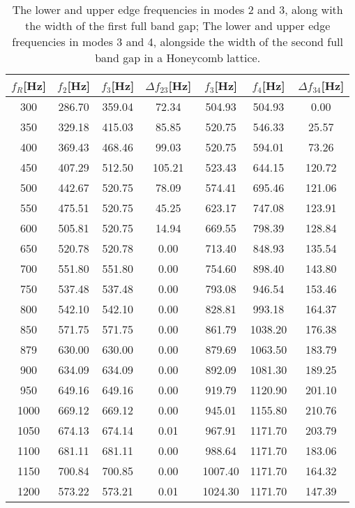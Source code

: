 \documentclass{article}
\begin{document}
\begin{table}[htb]
\centering
\caption{The lower and upper edge frequencies in modes 2 and 3, along with the width of the first full band gap; The lower and upper edge frequencies in modes 3 and 4, alongside the width of the second full band gap in a Honeycomb lattice.}
\label{tab400}
\begin{tabular}{ccccccc}
\hline
$f_R$[Hz] & $f_2$[Hz] & $f_3$[Hz] & $\Delta f _{23}$[Hz] & $f_3$[Hz] & $f_4$[Hz] & $\Delta f _{34}$[Hz] \\ \hline
300 & 286.70 & 359.04 & 72.34 & 504.93 & 504.93 & 0.00 \\ \hline
350 & 329.18 & 415.03 & 85.85 & 520.75 & 546.33 & 25.57 \\ \hline
400 & 369.43 & 468.46 & 99.03 & 520.75 & 594.01 & 73.26 \\ \hline
450 & 407.29 & 512.50 & 105.21 & 523.43 & 644.15 & 120.72 \\ \hline
500 & 442.67 & 520.75 & 78.09 & 574.41 & 695.46 & 121.06 \\ \hline
550 & 475.51 & 520.75 & 45.25 & 623.17 & 747.08 & 123.91 \\ \hline
600 & 505.81 & 520.75 & 14.94 & 669.55 & 798.39 & 128.84 \\ \hline
650 & 520.78 & 520.78 & 0.00 & 713.40 & 848.93 & 135.54 \\ \hline
700 & 551.80 & 551.80 & 0.00 & 754.60 & 898.40 & 143.80 \\ \hline
750 & 537.48 & 537.48 & 0.00 & 793.08 & 946.54 & 153.46 \\ \hline
800 & 542.10 & 542.10 & 0.00 & 828.81 & 993.18 & 164.37 \\ \hline
850 & 571.75 & 571.75 & 0.00 & 861.79 & 1038.20 & 176.38 \\ \hline
879 & 630.00 & 630.00 & 0.00 & 879.69 & 1063.50 & 183.79 \\ \hline
900 & 634.09 & 634.09 & 0.00 & 892.09 & 1081.30 & 189.25 \\ \hline
950 & 649.16 & 649.16 & 0.00 & 919.79 & 1120.90 & 201.10 \\ \hline
1000 & 669.12 & 669.12 & 0.00 & 945.01 & 1155.80 & 210.76 \\ \hline
1050 & 674.13 & 674.14 & 0.01 & 967.91 & 1171.70 & 203.79 \\ \hline
1100 & 681.11 & 681.11 & 0.00 & 988.64 & 1171.70 & 183.06 \\ \hline
1150 & 700.84 & 700.85 & 0.00 & 1007.40 & 1171.70 & 164.32 \\ \hline
1200 & 573.22 & 573.21 & 0.01 & 1024.30 & 1171.70 & 147.39 \\ \hline
\end{tabular}
\end{table}
\end{document}
